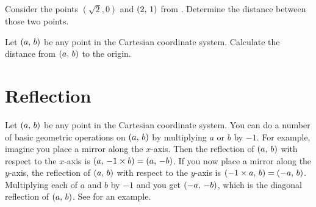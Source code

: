 \documentclass[a4paper,oneside,12pt]{article}
\begin{document}
\begin{exercise}
Consider the points $(\sqrt{2}\comma 0)$ and $\left\lparen{2},\, {1}\right\rparen$ from
.  Determine the distance
between those two points.
\end{exercise}


\begin{exercise}
Let $\left\lparen{a},\, {b}\right\rparen$ be any point in the Cartesian coordinate system.
Calculate the distance from $\left\lparen{a},\, {b}\right\rparen$ to the origin.
\end{exercise}




\section{Reflection}

Let $\left\lparen{a},\, {b}\right\rparen$ be any point in the Cartesian coordinate system.
You can do a number of basic geometric operations on $\left\lparen{a},\, {b}\right\rparen$ by
multiplying $a$ or $b$ by $-1$.  For example, imagine you place a
mirror along the $x$-axis.  Then the reflection of $\left\lparen{a},\, {b}\right\rparen$ with
respect to the $x$-axis is $\left\lparen{a},\, {-1 \times b}\right\rparen = \left\lparen{a},\, {-b}\right\rparen$.
If you now place a mirror along the $y$-axis, the reflection of
$\left\lparen{a},\, {b}\right\rparen$ with respect to the $y$-axis is
$\left\lparen{-1 \times a},\, {b}\right\rparen = \left\lparen{-a},\, {b}\right\rparen$.  Multiplying each of $a$ and
$b$ by $-1$ and you get $\left\lparen{-a},\, {-b}\right\rparen$, which is the diagonal
reflection of $\left\lparen{a},\, {b}\right\rparen$.  See 
for an example.
\end{document}
